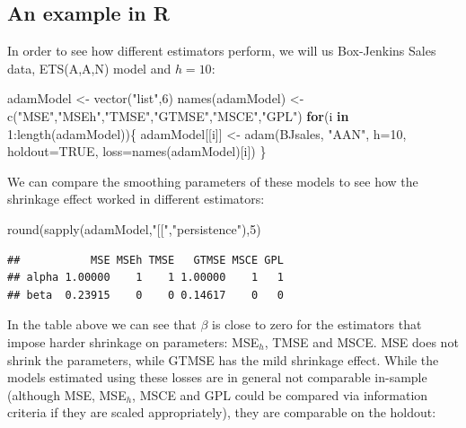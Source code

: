 \documentclass[
]{book}
\newenvironment{Shaded}{\begin{snugshade}}{\end{snugshade}}
\newcommand{\AttributeTok}[1]{\textcolor[rgb]{0.77,0.63,0.00}{#1}}
\newcommand{\ConstantTok}[1]{\textcolor[rgb]{0.00,0.00,0.00}{#1}}
\newcommand{\ControlFlowTok}[1]{\textcolor[rgb]{0.13,0.29,0.53}{\textbf{#1}}}
\newcommand{\DecValTok}[1]{\textcolor[rgb]{0.00,0.00,0.81}{#1}}
\newcommand{\FunctionTok}[1]{\textcolor[rgb]{0.00,0.00,0.00}{#1}}
\newcommand{\NormalTok}[1]{#1}
\newcommand{\OtherTok}[1]{\textcolor[rgb]{0.56,0.35,0.01}{#1}}
\newcommand{\SpecialCharTok}[1]{\textcolor[rgb]{0.00,0.00,0.00}{#1}}
\newcommand{\StringTok}[1]{\textcolor[rgb]{0.31,0.60,0.02}{#1}}
\theoremstyle{definition}
\theoremstyle{definition}
\theoremstyle{definition}
\theoremstyle{definition}
\theoremstyle{remark}
\begin{document}
\hypertarget{an-example-in-r-2}{%
\subsection{An example in R}\label{an-example-in-r-2}}

In order to see how different estimators perform, we will us Box-Jenkins Sales data, ETS(A,A,N) model and \(h=10\):

\begin{Shaded}
\begin{Highlighting}[]
\NormalTok{adamModel }\OtherTok{\textless{}{-}} \FunctionTok{vector}\NormalTok{(}\StringTok{"list"}\NormalTok{,}\DecValTok{6}\NormalTok{)}
\FunctionTok{names}\NormalTok{(adamModel) }\OtherTok{\textless{}{-}} \FunctionTok{c}\NormalTok{(}\StringTok{"MSE"}\NormalTok{,}\StringTok{"MSEh"}\NormalTok{,}\StringTok{"TMSE"}\NormalTok{,}\StringTok{"GTMSE"}\NormalTok{,}\StringTok{"MSCE"}\NormalTok{,}\StringTok{"GPL"}\NormalTok{)}
\ControlFlowTok{for}\NormalTok{(i }\ControlFlowTok{in} \DecValTok{1}\SpecialCharTok{:}\FunctionTok{length}\NormalTok{(adamModel))\{}
\NormalTok{  adamModel[[i]] }\OtherTok{\textless{}{-}} \FunctionTok{adam}\NormalTok{(BJsales, }\StringTok{"AAN"}\NormalTok{, }\AttributeTok{h=}\DecValTok{10}\NormalTok{, }\AttributeTok{holdout=}\ConstantTok{TRUE}\NormalTok{,}
                         \AttributeTok{loss=}\FunctionTok{names}\NormalTok{(adamModel)[i])}
\NormalTok{\}}
\end{Highlighting}
\end{Shaded}

We can compare the smoothing parameters of these models to see how the shrinkage effect worked in different estimators:

\begin{Shaded}
\begin{Highlighting}[]
\FunctionTok{round}\NormalTok{(}\FunctionTok{sapply}\NormalTok{(adamModel,}\StringTok{"[["}\NormalTok{,}\StringTok{"persistence"}\NormalTok{),}\DecValTok{5}\NormalTok{)}
\end{Highlighting}
\end{Shaded}

\begin{verbatim}
##           MSE MSEh TMSE   GTMSE MSCE GPL
## alpha 1.00000    1    1 1.00000    1   1
## beta  0.23915    0    0 0.14617    0   0
\end{verbatim}

In the table above we can see that \(\beta\) is close to zero for the estimators that impose harder shrinkage on parameters: MSE\(_h\), TMSE and MSCE. MSE does not shrink the parameters, while GTMSE has the mild shrinkage effect. While the models estimated using these losses are in general not comparable in-sample (although MSE, MSE\(_h\), MSCE and GPL could be compared via information criteria if they are scaled appropriately), they are comparable on the holdout:
\end{document}
